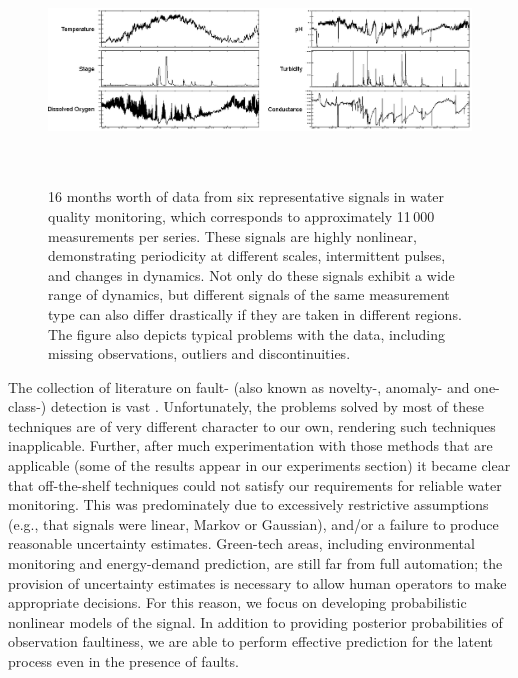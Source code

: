 \documentclass{article}
\begin{document}
\begin{figure}[t!]
\begin{center}
 \includegraphics[width=\textwidth, height=6cm]{watermonitoring.eps}
\end{center}
\caption{16 months worth of data from six representative
signals in water quality monitoring,
which corresponds to approximately 11\,000 measurements per series.
These signals are highly nonlinear, demonstrating periodicity at
different scales,
intermittent pulses, and changes in dynamics. Not only do these
signals exhibit a wide range of dynamics,
but different signals of the same measurement type can also differ
drastically if they are taken in different regions. The figure also depicts typical problems with the data, including missing observations, outliers and discontinuities.
}
\label{fig:monitoring}
\end{figure}


The collection of literature on fault- (also known as novelty-, anomaly-
and one-class-) detection is vast
\cite{Isermann2005, Ding2008,Markou2003,Chandola:2009,Khan2010,Dereszynski}.
Unfortunately, the problems solved by most of these techniques are of
very different character to our own, rendering such techniques
inapplicable. Further, after
much experimentation with those methods that are applicable (some of the results
appear in our experiments section) it became clear that off-the-shelf
techniques could not satisfy our requirements for reliable water
monitoring. This was predominately due to excessively restrictive assumptions
(e.g., that signals were linear, Markov or Gaussian), and/or a failure to
produce reasonable uncertainty
estimates. Green-tech areas, including environmental monitoring and
energy-demand prediction, are still far from full
automation; the provision of uncertainty estimates is necessary to
allow human operators to make appropriate decisions. For this reason,
we focus on developing probabilistic nonlinear models of the signal. In
addition to
providing posterior probabilities of observation faultiness, we are
able to perform effective prediction for the latent process even in
the presence of faults.
\end{document}
